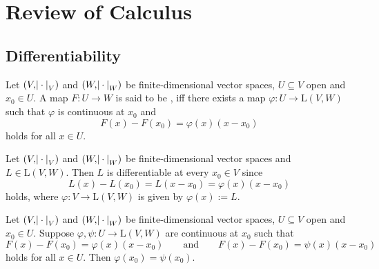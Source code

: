 \chapter{Review of Calculus}
\section*{Differentiability}

\begin{definition}
	Let $(V,\abs{\>\cdot\>}_V)$ and $(W,\abs{\>\cdot\>}_W)$ be finite-dimensional vector spaces, $U \subseteq V$ open and $x_0 \in U$. A map $F : U \to W$ is said to be , iff there exists a map $\varphi : U \to \mathrm{L}(V,W)$ such that $\varphi$ is continuous at $x_0$ and
	\begin{equation}
		\label{eq:differentiable}
		F(x) - F(x_0) = \varphi(x)(x - x_0)
	\end{equation}
	\noindent holds for all $x \in U$. 
\end{definition}

\begin{example}
	Let $(V,\abs{\>\cdot\>}_V)$ and $(W,\abs{\>\cdot\>}_W)$ be finite-dimensional vector spaces and $L \in \mathrm{L}(V,W)$. Then $L$ is differentiable at every $x_0 \in V$ since
	\begin{equation*}
		L(x) - L(x_0) = L(x - x_0) = \varphi(x)(x - x_0)
	\end{equation*}
	\noindent holds, where $\varphi : V \to \mathrm{L}(V,W)$ is given by $\varphi(x) := L$.
\end{example} 

\begin{proposition}
	Let $(V,\abs{\>\cdot\>}_V)$ and $(W,\abs{\>\cdot\>}_W)$ be finite-dimensional vector spaces, $U \subseteq V$ open and $x_0 \in U$. Suppose $\varphi,\psi : U \to \mathrm{L}(V,W)$ are continuous at $x_0$ such that  
	\begin{equation*}
		F(x) - F(x_0) = \varphi(x)(x - x_0) \qquad \text{and} \qquad F(x) - F(x_0) = \psi(x)(x - x_0)
	\end{equation*}	
	\noindent holds for all $x \in U$. Then $\varphi(x_0) = \psi(x_0)$.
\end{proposition}

